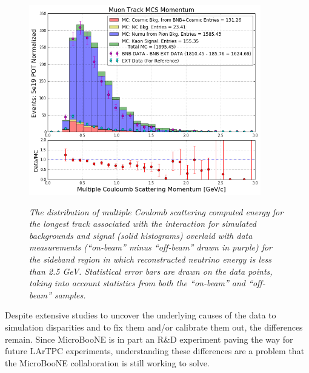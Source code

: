 \begin{figure}[ht!]
\centering
	\includegraphics[width=0.9\textwidth]{Figures/kaon_sideband_comp_MCS.png} \\
\caption{\textit{The distribution of multiple Coulomb scattering computed energy for the longest track associated with the interaction for simulated backgrounds and signal (solid histograms) overlaid with data measurements (``on-beam'' minus ``off-beam'' drawn in purple) for the sideband region in which reconstructed neutrino energy is less than 2.5 GeV. Statistical error bars are drawn on the data points, taking into account statistics from both the ``on-beam'' and ``off-beam'' samples.}}\label{kaon_sideband_comp_MCS}
\end{figure}


Despite extensive studies to uncover the underlying causes of the data to simulation disparities and to fix them and/or calibrate them out, the differences remain. Since MicroBooNE is in part an R\&D experiment paving the way for future LArTPC experiments, understanding these differences are a problem that the MicroBooNE collaboration is still working to solve.\\

